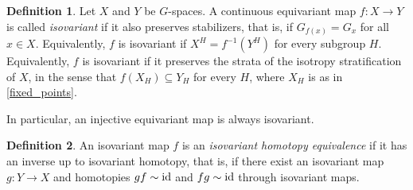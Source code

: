 \documentclass[11pt]{amsart}
\newtheorem{lem}{Lemma}[section]
\theoremstyle{definition}
\newtheorem{defn}{Definition}[section]
\numberwithin{equation}{section}
\numberwithin{figure}{section}
\newcommand{\id}{\textup{id}}
\newcommand{\ourdefn}[1]{{\it #1}}
\begin{document}

\begin{defn}\label{isovariant}
 Let $X$ and $Y$ be $G$-spaces. A continuous equivariant map $f\colon X \to Y$ is called \ourdefn{isovariant} if it also preserves stabilizers, that is, if $G_{f(x)} = G_x$ for all $x\in X$. Equivalently, $f$ is isovariant if $X^H=f^{-1}(Y^H)$ for every subgroup $H$. Equivalently, $f$ is isovariant if it preserves the strata of the isotropy stratification of $X$, in the sense that $f(X_H)\subseteq Y_H$ for every $H$, where $X_H$ is as in \autoref{fixed_points}.
 \end{defn}
 
In particular, an injective equivariant map is always isovariant.

\begin{defn}\label{isovariantheq}
	An isovariant map $f$ is an \ourdefn{isovariant homotopy equivalence} if it has an inverse up to isovariant homotopy, that is, if there exist an isovariant map $g:Y\to X$ and homotopies $gf \sim \id$ and $fg \sim \id$ through isovariant maps.
\end{defn}
 

 
\end{document}
